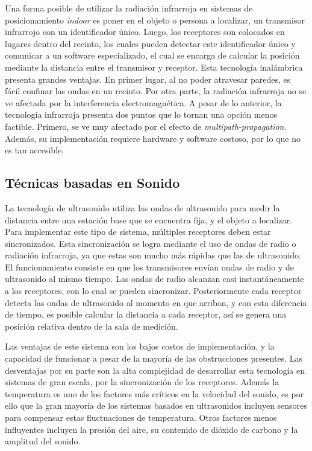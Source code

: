 Una forma posible de utilizar la radiación infrarroja en sistemas de posicionamiento \textit{indoor} es poner en el objeto o persona a localizar, un transmisor infrarrojo con un identificador único. Luego, los receptores son colocados en lugares dentro del recinto, los cuales pueden detectar este identificador único y comunicar a un software especializado, el cual se encarga de calcular la posición mediante la distancia entre el transmisor y receptor. Esta tecnología inalámbrica presenta grandes ventajas. En primer lugar, al no poder atravesar paredes, es fácil confinar las ondas en un recinto. Por otra parte, la radiación infrarroja no se ve afectada por la interferencia electromagnética. A pesar de lo anterior, la tecnología infrarroja presenta dos puntos que lo tornan una opción menos factible. Primero, se ve muy afectado por el efecto de \textit{multipath-propagation}. Además, su implementación requiere hardware y software costoso, por lo que no es tan accesible.

\subsection{Técnicas basadas en Sonido}

La tecnología de ultrasonido utiliza las ondas de ultrasonido para medir la distancia entre una estación base que se encuentra fija, y el objeto a localizar. Para implementar este tipo de sistema, múltiples receptores deben estar sincronizados. Esta sincronización se logra mediante el uso de ondas de radio o radiación infrarroja, ya que estas son mucho más rápidas que las de ultrasonido. El funcionamiento consiste en que los transmisores envían ondas de radio y de ultrasonido al mismo tiempo. Las ondas de radio alcanzan casi instantáneamente a los receptores, con lo cual se pueden sincronizar. Posteriormente cada receptor detecta las ondas de ultrasonido al momento en que arriban, y con esta diferencia de tiempo, es posible calcular la distancia a cada receptor, así se genera una posición relativa dentro de la sala de medición.

Las ventajas de este sistema son los bajos costos de implementación, y la capacidad de funcionar a pesar de la mayoría de las obstrucciones presentes. Las desventajas por su parte son la alta complejidad de desarrollar esta tecnología en sistemas de gran escala, por la sincronización de los receptores. Además la temperatura es uno de los factores más críticos en la velocidad del sonido, es por ello que la gran mayoría de los sistemas basados en ultrasonidos incluyen sensores para compensar estas fluctuaciones de temperatura. Otros factores menos influyentes incluyen la presión del aire, su contenido de dióxido de carbono y la amplitud del sonido.

